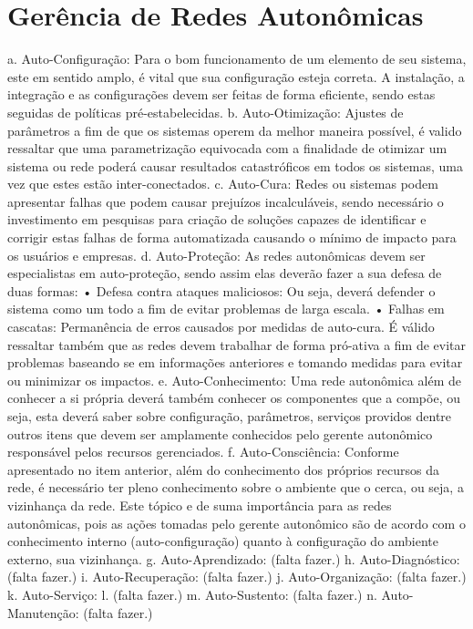 \documentclass[11pt,twoside]{article}
\begin{document}
\section{Gerência de Redes Autonômicas}
a.	Auto-Configuração:
Para o bom funcionamento de um elemento de seu sistema, este em sentido amplo, é vital que sua configuração esteja correta. A instalação, a integração e as configurações devem ser feitas de forma eficiente, sendo estas seguidas de políticas pré-estabelecidas.
b.	Auto-Otimização:
Ajustes de parâmetros a fim de que os sistemas operem da melhor maneira possível, é valido ressaltar que uma parametrização equivocada com a finalidade de otimizar um sistema ou rede poderá causar resultados catastróficos em todos os sistemas, uma vez que estes estão inter-conectados.
c.	Auto-Cura:
Redes ou sistemas podem apresentar falhas que podem causar prejuízos incalculáveis, sendo necessário o investimento em pesquisas para criação de soluções capazes de identificar e corrigir estas falhas de forma automatizada causando o mínimo de impacto para os usuários e empresas.
d.	Auto-Proteção:
As redes autonômicas devem ser especialistas em auto-proteção, sendo assim elas deverão fazer a sua defesa de duas formas: 
•	Defesa contra ataques maliciosos: Ou seja, deverá defender o sistema como um todo a fim de evitar problemas de larga escala.
•	Falhas em cascatas: Permanência de erros causados por medidas de auto-cura.
É válido ressaltar também que as redes devem trabalhar de forma pró-ativa a fim de evitar problemas baseando se em informações anteriores e tomando medidas para evitar ou minimizar os impactos.
e.	Auto-Conhecimento:
Uma rede autonômica além de conhecer a si própria deverá também conhecer os componentes que a compõe, ou seja, esta deverá saber sobre configuração, parâmetros, serviços providos dentre outros itens que devem ser amplamente conhecidos pelo gerente autonômico responsável pelos recursos gerenciados. 
f.	Auto-Consciência:
Conforme apresentado no item anterior, além do conhecimento dos próprios recursos da rede, é necessário ter pleno conhecimento sobre o ambiente que o cerca, ou seja, a vizinhança da rede. Este tópico e de suma importância para as redes autonômicas, pois as ações tomadas pelo gerente autonômico são de acordo com o conhecimento interno (auto-configuração) quanto à configuração do ambiente externo, sua vizinhança.
g.	Auto-Aprendizado:
	(falta fazer.)
h.	Auto-Diagnóstico:
(falta fazer.)
i.	Auto-Recuperação:
	(falta fazer.)
j.	Auto-Organização:
(falta fazer.)
k.	Auto-Serviço:
l.		(falta fazer.)
m.	Auto-Sustento:
	(falta fazer.)
n.	Auto-Manutenção:
	(falta fazer.)
\end{document}
